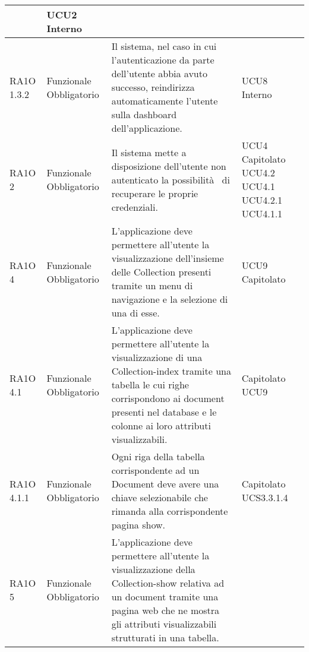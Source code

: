 \begin{center}
\begin{longtable}{ | l | p{2cm} | p{5cm} | p{1.7cm} |}
 &  UCU2 \newline  Interno \newline  \\ \hline      
        RA1O 1.3.2 & Funzionale \newline  Obbligatorio  & Il sistema, nel caso in cui l'autenticazione da parte dell'utente abbia avuto successo, reindirizza automaticamente l'utente sulla dashboard dell'applicazione.
 &  UCU8 \newline  Interno \newline  \\ \hline      
        RA1O 2  & Funzionale \newline  Obbligatorio  & Il sistema mette a disposizione dell'utente non autenticato la possibilità  di recuperare le proprie credenziali. &  UCU4 \newline  Capitolato \newline  UCU4.2 \newline  UCU4.1 \newline  UCU4.2.1 \newline  UCU4.1.1 \newline  \\ \hline      
        RA1O 4 & Funzionale \newline  Obbligatorio  & L'applicazione deve permettere all'utente la visualizzazione dell'insieme delle Collection presenti tramite un menu di navigazione e la selezione di una di esse. &  UCU9 \newline  Capitolato \newline  \\ \hline      
        RA1O 4.1  & Funzionale \newline  Obbligatorio  & L'applicazione deve permettere all'utente la visualizzazione di una Collection-index tramite una tabella le cui righe corrispondono ai document presenti nel database e le colonne ai loro attributi visualizzabili.  &  Capitolato \newline  UCU9 \newline  \\ \hline      
        RA1O 4.1.1  & Funzionale \newline  Obbligatorio  & Ogni riga della tabella corrispondente ad un Document deve avere una chiave selezionabile che rimanda alla corrispondente pagina show. &  Capitolato \newline  UCS3.3.1.4 \newline  \\ \hline      
        RA1O 5  & Funzionale \newline  Obbligatorio  & L'applicazione deve permettere all'utente la visualizzazione della Collection-show relativa ad un document tramite una pagina web che ne mostra gli attributi visualizzabili strutturati in una tabella.

\end{longtable}
\end{center}
